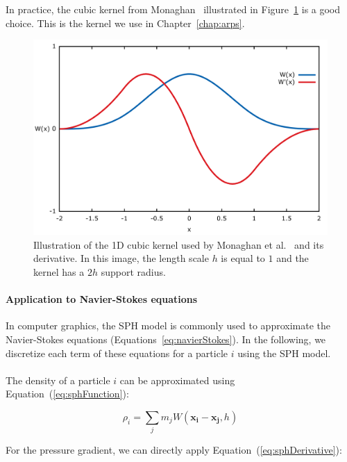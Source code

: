 In practice, the cubic kernel from Monaghan~\cite{Monaghan1992} illustrated in Figure~\ref{fig:cubicKernel} is a good choice.
This is the kernel we use in Chapter~\ref{chap:arps}.

\begin{figure}[!ht]
	\centering
	\includegraphics[scale=0.6]{images/continuum_mechanics/cubicKernel.png}
	\caption[STAR mechanics: Cubic kernel]{\label{fig:cubicKernel}
		Illustration of the 1D cubic kernel used by Monaghan et al.~\cite{Monaghan1992} and its derivative.
    In this image, the length scale $h$ is equal to $1$ and the kernel has a $2h$ support radius.}
\end{figure}

\paragraph{Application to Navier-Stokes equations}

In computer graphics, the SPH model is commonly used to approximate the Navier-Stokes equations (Equations~\ref{eq:navierStokes}).
In the following, we discretize each term of these equations for a particle $i$ using the SPH model.
\\ \\
The density of a particle $i$ can be approximated using Equation~(\ref{eq:sphFunction}):

\begin{equation}
\label{eq:densitySPH}
\rho_{i} = \sum_{j} m_{j}W(\mathbf{x_{i}}-\mathbf{x_{j}},h)
\end{equation}

For the pressure gradient, we can directly apply Equation~(\ref{eq:sphDerivative}):

